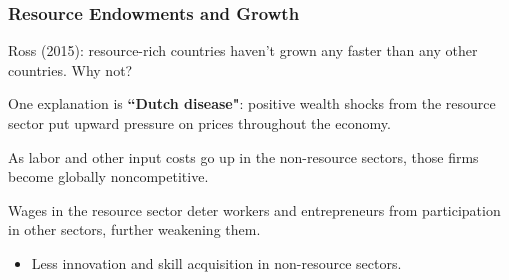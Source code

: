 \documentclass[handout]{beamer}
\begin{document}
\begin{frame} 
	\frametitle{\LARGE{Resource Endowments and Growth}}
	\begin{itemize}
		\large{
			\item Ross (2015): resource-rich countries haven't grown any faster than any other countries. Why not? \pause 
			\item One explanation is \textbf{``Dutch disease"}: positive wealth shocks from the resource sector put upward pressure on prices throughout the economy. \pause 
			\item As labor and other input costs go up in the non-resource sectors, those firms become globally noncompetitive.  \pause 
			\item Wages in the resource sector deter workers and entrepreneurs from participation in other sectors, further weakening them.  \pause 
			\begin{itemize}
				\item Less innovation and skill acquisition in non-resource sectors.
			\end{itemize}
		}
	\end{itemize}
\end{frame}

\end{document}

